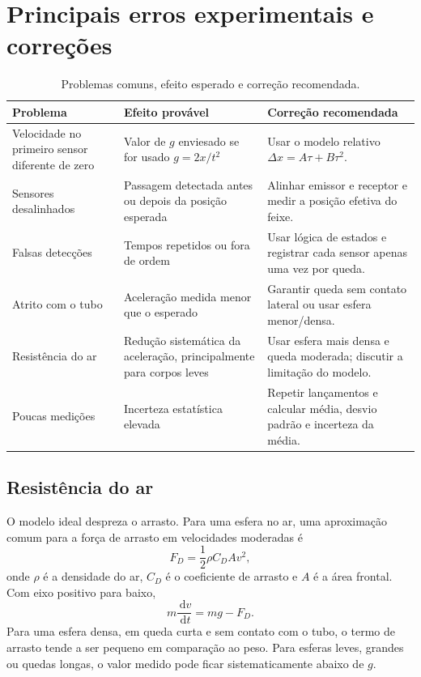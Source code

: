 \documentclass[11pt,a4paper]{article}
\newcommand{\dif}{\,\mathrm{d}}
\begin{document}
\section{Principais erros experimentais e correções}

\begin{table}[htbp]
\centering
\caption{Problemas comuns, efeito esperado e correção recomendada.}
\label{tab:erros}
\begin{tabularx}{\textwidth}{>{\raggedright\arraybackslash}p{}>{\raggedright\arraybackslash}p{}X}
\toprule
\textbf{Problema} & \textbf{Efeito provável} & \textbf{Correção recomendada} \\
\midrule
Velocidade no primeiro sensor diferente de zero & Valor de $g$ enviesado se for usado $g=2x/t^2$ & Usar o modelo relativo $\Delta x=A\tau+B\tau^2$. \\
Sensores desalinhados & Passagem detectada antes ou depois da posição esperada & Alinhar emissor e receptor e medir a posição efetiva do feixe. \\
Falsas detecções & Tempos repetidos ou fora de ordem & Usar lógica de estados e registrar cada sensor apenas uma vez por queda. \\
Atrito com o tubo & Aceleração medida menor que o esperado & Garantir queda sem contato lateral ou usar esfera menor/densa. \\
Resistência do ar & Redução sistemática da aceleração, principalmente para corpos leves & Usar esfera mais densa e queda moderada; discutir a limitação do modelo. \\
Poucas medições & Incerteza estatística elevada & Repetir lançamentos e calcular média, desvio padrão e incerteza da média. \\
\bottomrule
\end{tabularx}
\end{table}

\subsection{Resistência do ar}

O modelo ideal despreza o arrasto. Para uma esfera no ar, uma aproximação comum para a força de arrasto em velocidades moderadas é
\begin{equation}
  F_D=\frac{1}{2}\rho C_D A v^2,
\end{equation}
onde $\rho$ é a densidade do ar, $C_D$ é o coeficiente de arrasto e $A$ é a área frontal. Com eixo positivo para baixo,
\begin{equation}
  m\frac{\dif v}{\dif t}=mg-F_D.
\end{equation}
Para uma esfera densa, em queda curta e sem contato com o tubo, o termo de arrasto tende a ser pequeno em comparação ao peso. Para esferas leves, grandes ou quedas longas, o valor medido pode ficar sistematicamente abaixo de $g$.
\end{document}
